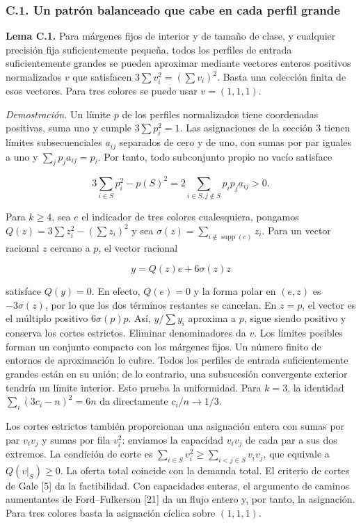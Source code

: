 \documentclass[spanish,11pt,a4paper]{article}
\begin{document}
\subsubsection{C.1. Un patrón balanceado que cabe en cada perfil grande}\label{c.1.-un-patruxf3n-balanceado-que-cabe-en-cada-perfil-grande}

\textbf{Lema C.1.} Para márgenes fijos de interior y de tamaño de clase, y cualquier precisión fija suficientemente pequeña, todos los perfiles de entrada suficientemente grandes se pueden aproximar mediante vectores enteros positivos normalizados \(v\) que satisfacen \(3\sum v_i^2=(\sum v_i)^2\). Basta una colección finita de esos vectores. Para tres colores se puede usar \(v=(1,1,1)\).

\emph{Demostración.} Un límite \(p\) de los perfiles normalizados tiene coordenadas positivas, suma uno y cumple \(3\sum p_i^2=1\). Las asignaciones de la sección 3 tienen límites subsecuenciales \(a_{ij}\) separados de cero y de uno, con sumas por par iguales a uno y \(\sum_jp_ja_{ij}=p_i\). Por tanto, todo subconjunto propio no vacío satisface

\[3\sum_{i\in S}p_i^2-p(S)^2=2\sum_{i\in S,j\notin S}p_ip_ja_{ij}>0.\]

Para \(k\ge4\), sea \(e\) el indicador de tres colores cualesquiera, pongamos \(Q(z)=3\sum z_i^2-(\sum z_i)^2\) y sea \(\sigma(z)=\sum_{i\notin\operatorname{supp}(e)}z_i\). Para un vector racional \(z\) cercano a \(p\), el vector racional

\[y=Q(z)e+6\sigma(z)z\]

satisface \(Q(y)=0\). En efecto, \(Q(e)=0\) y la forma polar en \((e,z)\) es \(-3\sigma(z)\), por lo que los dos términos restantes se cancelan. En \(z=p\), el vector es el múltiplo positivo \(6\sigma(p)p\). Así, \(y/\sum y_i\) aproxima a \(p\), sigue siendo positivo y conserva los cortes estrictos. Eliminar denominadores da \(v\). Los límites posibles forman un conjunto compacto con los márgenes fijos. Un número finito de entornos de aproximación lo cubre. Todos los perfiles de entrada suficientemente grandes están en su unión; de lo contrario, una subsucesión convergente exterior tendría un límite interior. Esto prueba la uniformidad. Para \(k=3\), la identidad \(\sum_i(3c_i-n)^2=6n\) da directamente \(c_i/n\to1/3\).

Los cortes estrictos también proporcionan una asignación entera con sumas por par \(v_iv_j\) y sumas por fila \(v_i^2\): enviamos la capacidad \(v_iv_j\) de cada par a sus dos extremos. La condición de corte es \(\sum_{i\in S}v_i^2\ge\sum_{i<j\in S}v_iv_j\), que equivale a \(Q(v|_S)\ge0\). La oferta total coincide con la demanda total. El criterio de cortes de Gale {[}5{]} da la factibilidad. Con capacidades enteras, el argumento de caminos aumentantes de Ford--Fulkerson {[}21{]} da un flujo entero y, por tanto, la asignación. Para tres colores basta la asignación cíclica sobre \((1,1,1)\).
\end{document}
